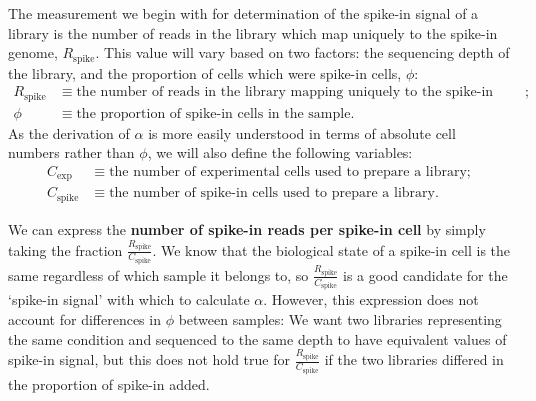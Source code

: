 The measurement we begin with for determination of the spike-in signal of a library is the number of reads in the library which map uniquely to the spike-in genome, $R_{\text{spike}}$.
This value will vary based on two factors: the sequencing depth of the library, and the proportion of cells which were spike-in cells, $\phi$:
\begin{align*}
    R_{\text{spike}} &\equiv \text{the number of reads in the library mapping uniquely to the spike-in genome}; \\
    \phi &\equiv \text{the proportion of spike-in cells in the sample}.
\end{align*}
As the derivation of $\alpha$ is more easily understood in terms of absolute cell numbers rather than $\phi$, we will also define the following variables:
\begin{align*}
    C_{\text{exp}} &\equiv \text{the number of experimental cells used to prepare a library}; \\
    C_{\text{spike}} &\equiv \text{the number of spike-in cells used to prepare a library}.
\end{align*}

We can express the \textbf{number of spike-in reads per spike-in cell} by simply taking the fraction $\frac{R_{\text{spike}}}{C_{\text{spike}}}$.
We know that the biological state of a spike-in cell is the same regardless of which sample it belongs to, so $\frac{R_{\text{spike}}}{C_{\text{spike}}}$ is a good candidate for the `spike-in signal' with which to calculate $\alpha$.
However, this expression does not account for differences in $\phi$ between samples: We want two libraries representing the same condition and sequenced to the same depth to have equivalent values of spike-in signal, but this does not hold true for $\frac{R_{\text{spike}}}{C_{\text{spike}}}$ if the two libraries differed in the proportion of spike-in added.

